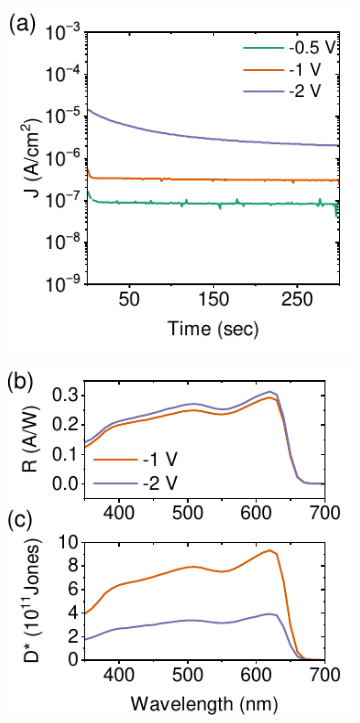\begin{figure}[htbp]
    \centering
    \begin{subfigure}[t]{0.46\textwidth}
        \centering
        \includegraphics[width=\textwidth]{chapters/transport_layers/images/AP38_9_Static.pdf} %
      
    \end{subfigure}
    \hfill
    \begin{subfigure}[t]{0.44\textwidth}
        \centering
        \includegraphics[width=\textwidth]{chapters/transport_layers/images/Responsivity_Detectivity.pdf} %
       

\end{subfigure}
\end{figure}
